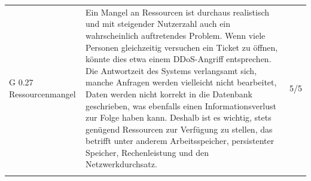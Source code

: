 \documentclass[a4paper,
    11pt,
    headings=small,
    ngerman,
    listof=totoc,
    numbers=noenddot]{scrreprt}[2021/11/13]
\begin{document}
\begin{longtable}{p{}p{}l}
  G 0.27 Ressourcenmangel                                                                                                                                                                                         & Ein Mangel an Ressourcen ist durchaus realistisch und mit steigender Nutzerzahl auch ein wahrscheinlich auftretendes Problem. Wenn viele Personen gleichzeitig versuchen ein Ticket zu öffnen, könnte dies etwa einem DDoS-Angriff entsprechen. Die Antwortzeit des Systems verlangsamt sich, manche Anfragen werden vielleicht nicht bearbeitet, Daten werden nicht korrekt in die Datenbank geschrieben, was ebenfalls einen Informationsverlust zur Folge haben kann. Deshalb ist es wichtig, stets genügend Ressourcen zur Verfügung zu stellen, das betrifft unter anderem Arbeitsspeicher, persistenter Speicher, Rechenleistung und den Netzwerkdurchsatz. & 5/5         \\
  \label{tab:Risikoanalyse}
\end{longtable}
\end{document}
